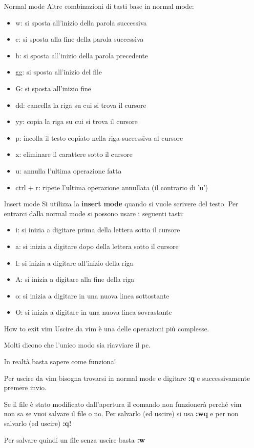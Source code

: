 \documentclass{beamer}
\begin{document}
\begin{frame}{Normal mode}
  Altre combinazioni di tasti base in normal mode:
  \begin{itemize}
    \item w: si sposta all'inizio della parola successiva
    \item e: si sposta alla fine della parola successiva
    \item b: si sposta all'inizio della parola precedente
    \item gg: si sposta all'inizio del file
    \item G: si sposta all'inizio fine
    \item dd: cancella la riga su cui si trova il cursore
    \item yy: copia la riga su cui si trova il cursore
    \item p: incolla il testo copiato nella riga successiva al cursore
    \item x: eliminare il carattere sotto il cursore
    \item u: annulla l'ultima operazione fatta
    \item ctrl + r: ripete l'ultima operazione annullata (il contrario di 'u')
  \end{itemize}
\end{frame}

\begin{frame}{Insert mode}
  Si utilizza la \textbf{insert mode} quando si vuole scrivere del testo. Per
  entrarci dalla normal mode si possono usare i seguenti tasti:
  \begin{itemize}
    \item i: si inizia a digitare prima della lettera sotto il cursore
    \item a: si inizia a digitare dopo della lettera sotto il cursore
    \item I: si inizia a digitare all'inizio della riga
    \item A: si inizia a digitare alla fine della riga
    \item o: si inizia a digitare in una nuova linea sottostante
    \item O: si inizia a digitare in una nuova linea sovrastante
  \end{itemize}
\end{frame}

\begin{frame}{How to exit vim}
  Uscire da vim è una delle operazioni più complesse. \medskip \pause

  Molti dicono che l'unico modo sia riavviare il pc. \medskip \pause

  In realtà basta sapere come funziona! \medskip

  Per uscire da vim bisogna trovarsi in normal mode e digitare \textbf{:q} e 
  successivamente premere invio.\medskip

  Se il file è stato modificato dall'apertura il comando non funzionerà perché
  vim non sa se vuoi salvare il file o no. Per salvarlo (ed uscire) si usa 
  \textbf{:wq} e per non salvarlo (ed uscire) \textbf{:q!} \medskip

  Per salvare quindi un file senza uscire basta \textbf{:w}
\end{frame}
\end{document}
